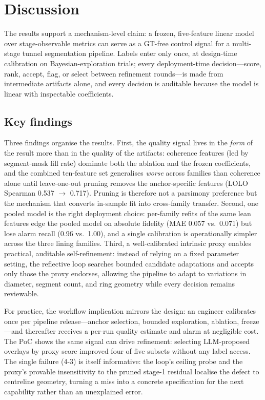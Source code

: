 \documentclass[a4paper,fleqn]{cas-dc}
\begin{document}
\section{Discussion}\label{sec:discussion}

The results support a mechanism-level claim: a frozen, five-feature linear model over stage-observable metrics can serve as a GT-free control signal for a multi-stage tunnel segmentation pipeline. Labels enter only once, at design-time calibration on Bayesian-exploration trials; every deployment-time decision---score, rank, accept, flag, or select between refinement rounds---is made from intermediate artifacts alone, and every decision is auditable because the model is linear with inspectable coefficients.

\subsection{Key findings}

Three findings organise the results. First, the quality signal lives in the \emph{form} of the result more than in the quality of the artifacts: coherence features (led by segment-mask fill rate) dominate both the ablation and the frozen coefficients, and the combined ten-feature set generalises \emph{worse} across families than coherence alone until leave-one-out pruning removes the anchor-specific features (LOLO Spearman 0.537 $\rightarrow$ 0.717). Pruning is therefore not a parsimony preference but the mechanism that converts in-sample fit into cross-family transfer. Second, one pooled model is the right deployment choice: per-family refits of the same lean features edge the pooled model on absolute fidelity (MAE 0.057 vs.\ 0.071) but lose alarm recall (0.96 vs.\ 1.00), and a single calibration is operationally simpler across the three lining families. Third, a well-calibrated intrinsic proxy enables practical, auditable self-refinement: instead of relying on a fixed parameter setting, the reflective loop searches bounded candidate adaptations and accepts only those the proxy endorses, allowing the pipeline to adapt to variations in diameter, segment count, and ring geometry while every decision remains reviewable.

For practice, the workflow implication mirrors the design: an engineer calibrates once per pipeline release---anchor selection, bounded exploration, ablation, freeze---and thereafter receives a per-run quality estimate and alarm at negligible cost. The PoC shows the same signal can drive refinement: selecting LLM-proposed overlays by proxy score improved four of five subsets without any label access. The single failure (4-3) is itself informative: the loop's ceiling probe and the proxy's provable insensitivity to the pruned stage-1 residual localise the defect to centreline geometry, turning a miss into a concrete specification for the next capability rather than an unexplained error.
\end{document}
